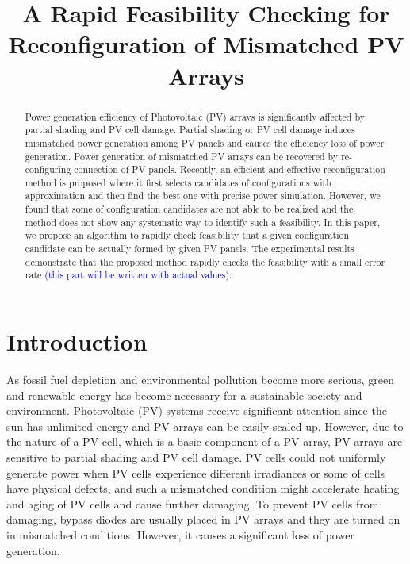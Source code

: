 \documentclass[conference]{IEEEtran}
\begin{document}
\title{A Rapid Feasibility Checking for Reconfiguration of Mismatched PV Arrays}
\author{
}
\maketitle

\begin{abstract}
Power generation efficiency of Photovoltaic (PV) arrays is significantly affected by partial shading and PV cell damage. Partial shading or PV cell damage induces mismatched power generation among PV panels and causes the efficiency loss of power generation. Power generation of mismatched PV arrays can be recovered by re-configuring connection of PV panels. Recently, an efficient and effective reconfiguration method is proposed where it first selects candidates of configurations with approximation and then find the best one with precise power simulation. However, we found that some of  configuration candidates are not able to be realized and the method does not show any systematic way to identify such a feasibility. In this paper, we propose an algorithm to rapidly check feasibility that a given configuration candidate can be actually formed by given PV panels. The experimental results demonstrate that the proposed method rapidly checks the feasibility with a small error rate \textcolor{blue}{(this part will be written with actual values)}.
\end{abstract}


\section{Introduction}
As fossil fuel depletion and environmental pollution become more serious, green and renewable energy has become necessary for a sustainable society and environment. Photovoltaic (PV) systems receive significant attention since the sun has unlimited energy and PV arrays can be easily scaled up. However, due to the nature of a PV cell, which is a basic component of a PV array, PV arrays are sensitive to partial shading and PV cell damage. PV cells could not uniformly generate power when PV cells experience different irradiances or some of cells have physical defects, and such a mismatched condition might accelerate heating and aging of PV cells and cause further damaging. To prevent PV cells from damaging, bypass diodes are usually placed in PV arrays and they are turned on in mismatched conditions. However, it causes a significant loss of power generation. 
\end{document}
